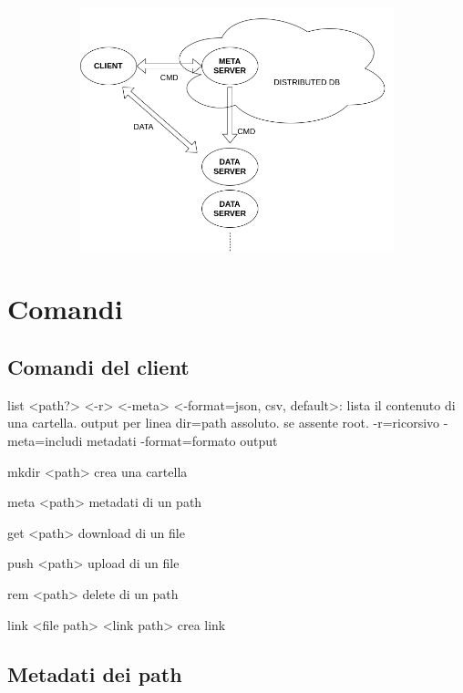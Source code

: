 \documentclass{article}
\begin{document}
\begin{figure}[H]
	\centering
	\begin{subfigure}{0.80\linewidth}
		\includegraphics[width=\linewidth]{../diagrams/architettura/7.png}
	\end{subfigure}
\end{figure}


\section{Comandi}


\subsection{Comandi del client}

list <path?> <-r> <-meta> <-format={json, csv, default}>:
lista il contenuto di una cartella. output per linea
dir=path assoluto. se assente root.
-r=ricorsivo
-meta=includi metadati
-format=formato output

mkdir <path>
crea una cartella

meta <path>
metadati di un path

get <path>
download di un file

push <path> 
upload di un file

rem <path>
delete di un path

link <file path> <link path> 
crea link 


\subsection{Metadati dei path}
\end{document}
